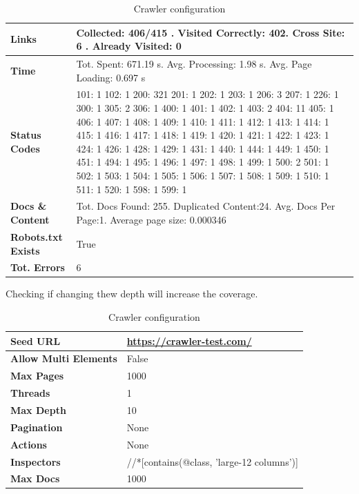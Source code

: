 {\begin{table}[ht] 
{\footnotesize
\begin{tabular}{ P{3cm} ||P{10.1cm}  }      %
 \hline \hline
\textbf{Links} & Collected: 406/415 . Visited Correctly: 402. Cross Site: 6 . Already Visited: 0\T\B 
\\ 
\hline
\textbf{Time} & Tot. Spent: 671.19 s. Avg. Processing: 1.98 s. Avg. Page Loading: 0.697 s\T\B 
\\
\hline
\textbf{Status Codes} &   101: 1  102: 1  200: 321  201: 1  202: 1  203: 1  206: 3  207: 1  226: 1  300: 1  305: 2  306: 1  400: 1  401: 1  402: 1  403: 2  404: 11  405: 1  406: 1  407: 1  408: 1  409: 1  410: 1  411: 1  412: 1  413: 1  414: 1  415: 1  416: 1  417: 1  418: 1  419: 1  420: 1  421: 1  422: 1  423: 1  424: 1  426: 1  428: 1  429: 1  431: 1  440: 1  444: 1  449: 1  450: 1  451: 1  494: 1  495: 1  496: 1  497: 1  498: 1  499: 1  500: 2  501: 1  502: 1  503: 1  504: 1  505: 1  506: 1  507: 1  508: 1  509: 1  510: 1  511: 1  520: 1  598: 1  
599: 1\T\B 
\\ 
\hline
\textbf{Docs \& Content} & Tot. Docs Found: 255. Duplicated Content:24. Avg. Docs Per Page:1. Average page size: 0.000346\T\B 
\\ 
\hline
\textbf{Robots.txt Exists} & True\T\B 
\\ 
\hline
\textbf{Tot. Errors} & 6\T\B 
\\ 
\hline \hline
    \end{tabular}
}
  \captionsetup{justification=centering,margin=2cm}
  \caption{Crawler configuration}
\end{table}

Checking if changing thew depth will increase the coverage.


\begin{table}[ht] 
{\footnotesize
\begin{tabular}{ P{3cm} ||P{10.1cm}  }      %
 \hline \hline
\textbf{Seed URL} & \href{https://crawler-test.com/}{https://crawler-test.com/}\T\B 
\\ 
\hline
\textbf{Allow Multi Elements} & False \T\B 
\\ 
\hline
\textbf{Max Pages} & 1000\T\B 
\\ 
\hline
\textbf{Threads} & 1\T\B 
\\ 
\hline
\textbf{Max Depth} & 10\T\B 
\\ 
\hline
\textbf{Pagination} & None\T\B 
\\ 
\hline
\textbf{Actions} & None\T\B 
\\ 
\hline
\textbf{Inspectors} & //*[contains(@class, 'large-12 columns')]\T\B 
\\ 
\hline
\textbf{Max Docs} & 1000\T\B 
\\ 
\hline \hline
    \end{tabular}
}
  \captionsetup{justification=centering,margin=2cm}
  \caption{Crawler configuration}
\end{table}



}
